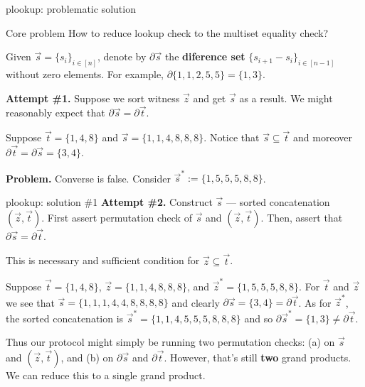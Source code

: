 \documentclass{zkdl-presentation-template}
\begin{document}
    \begin{frame}{plookup: problematic solution}
        \begin{block}{Core problem}
            How to reduce lookup check to the multiset equality check?
        \end{block}

        \begin{definition}
            Given $\vec{s} = \{s_i\}_{i \in [n]}$, denote by $\partial\vec{s}$
            the \textbf{diference set} $\{s_{i+1}-s_i\}_{i \in [n-1]}$ without
            zero elements. For example, $\partial\{1,1,2,5,5\} = \{1,3\}$.
        \end{definition}

        \textbf{Attempt \#1.} Suppose we sort witness $\vec{z}$ and get
        $\vec{s}$ as a result. We might reasonably expect that $\partial\vec{s}
        = \partial\vec{t}$.
        \begin{example}
            Suppose $\vec{t}=\{1,4,8\}$ and $\vec{s} = \{1,1,4,8,8,8\}$. Notice
            that $\vec{s} \subseteq \vec{t}$ and moreover $\partial\vec{t} =
            \partial\vec{s} = \{3,4\}$.
        \end{example}

        \textcolor{red!70!black}{\textbf{Problem.}} Converse is false. Consider $\vec{s}^*:=\{1,5,5,5,8,8\}$.
    \end{frame}

    \begin{frame}{plookup: solution \#1}
        \textbf{Attempt \#2.} Construct $\vec{s}$ --- sorted concatenation
        $(\vec{z},\vec{t})$. First assert permutation check of $\vec{s}$ and
        $(\vec{z},\vec{t})$. Then, assert that $\partial\vec{s} =
        \partial\vec{t}$.
        
        \begin{lemma}
            This is necessary and sufficient condition for $\vec{z} \subseteq
            \vec{t}$.
        \end{lemma}

        \begin{example}
            Suppose $\vec{t} = \{1,4,8\}$, $\vec{z} = \{1,1,4,8,8,8\}$, and
            $\vec{z}^*=\{1,5,5,5,8,8\}$. For $\vec{t}$ and $\vec{z}$ we see that
            $\vec{s} = \{1,1,1,4,4,8,8,8,8\}$ and clearly $\partial\vec{s} =
            \{3,4\} = \partial\vec{t}$. As for $\vec{z}^*$, the sorted
            concatenation is $\vec{s}^*=\{1,1,4,5,5,5,8,8,8\}$ and so
            $\partial\vec{s}^*=\{1,3\} \neq \partial\vec{t}$.
        \end{example}

        Thus our protocol might simply be running two permutation checks: (a) on
        $\vec{s}$ and $(\vec{z},\vec{t})$, and (b) on $\partial\vec{s}$ and
        $\partial\vec{t}$. However, that's still \textbf{two} grand products. We
        can reduce this to a single grand product.
    \end{frame}
\end{document}
